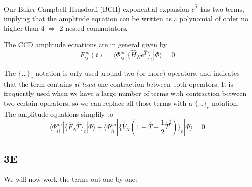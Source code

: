 \documentclass[norsk,a4paper,12pt]{article}
\begin{document}
Our Baker-Campbell-Hausdorff (BCH) exponential expansion $e^{\hat{T}}$ has two terms, implying that the amplitude equation can be written as a polynomial of order no higher than 4 $\Rightarrow$ 2 nested commutators. 

The CCD amplitude equations are in general given by
\begin{equation}
F_{ij}^{ab}(t)=\langle\Phi_{ij}^{ab}|\{\hat{H}_Ne^{\hat{T}}\}_c|\Phi\rangle=0
\end{equation}

The $\{...\}_c$ notation is only used around two (or more) operators, and indicates that the term contains \textit{at least} one contraction between both operators. It is frequently used when we have a large number of terms with contraction between two certain operators, so we can replace all those terms with a $\{...\}_c$ notation. The amplitude equations simplify to
\begin{equation}
\langle\Phi_{i\bar{i}}^{a\bar{a}}|\{\hat{F}_N\hat{T}\}_c|\Phi\rangle+\langle\Phi_{i\bar{i}}^{a\bar{a}}|\{\hat{V}_N(1+\hat{T}+\frac{1}{2}\hat{T}^2)\}_c|\Phi\rangle=0
\end{equation}

\subsection*{3E}
We will now work the terms out one by one:
\end{document}
